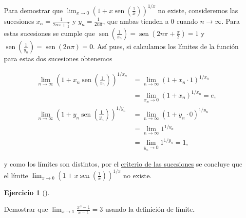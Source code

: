 \documentclass[
  spanish,
  a4paper,
]{scrreport}
\theoremstyle{definition}
\newtheorem{exercise}{Ejercicio}[chapter]
\theoremstyle{remark}
\begin{document}
\begin{tcolorbox}
Para demostrar que
\(\lim_{x\to 0}\left(1+x\operatorname{sen}\left(\frac{1}{x}\right)\right)^{1/x}\)
no existe, consideremos las sucesiones
\(x_n = \frac{1}{2n\pi+\frac{\pi}{2}}\) y \(y_n = \frac{1}{2n\pi}\), que
ambas tienden a 0 cuando \(n \to \infty\). Para estas sucesiones se
cumple que
\(\operatorname{sen}\left(\frac{1}{x_n}\right) = \operatorname{sen}(2n\pi+\frac{\pi}{2}) = 1\)
y
\(\operatorname{sen}\left(\frac{1}{y_n}\right) = \operatorname{sen}(2n\pi) = 0\).
Así pues, si calculamos los límites de la función para estas dos
sucesiones obtenemos

\begin{align*}
\lim_{n \to \infty} \left(1+x_n \operatorname{sen}\left(\frac{1}{x_n}\right)\right)^{1/x_n} 
&= \lim_{n \to \infty} (1+x_n\cdot 1)^{1/x_n} \\
&= \lim_{x_n\to 0} (1+x_n)^{1/x_n} = e,\\
\lim_{n \to \infty} \left(1+y_n \operatorname{sen}\left(\frac{1}{y_n}\right)\right)^{1/y_n} 
&= \lim_{n \to \infty} \left(1+y_n\cdot 0\right)^{1/y_n} \\
&= \lim_{n \to \infty} 1^{1/y_n} \\
&= \lim_{y_n\to 0} 1^{1/y_n} = 1,
\end{align*}

y como los límites son distintos, por el
\href{https://aprendeconalf.es/analisis-manual/06-limites.html\#thm-criterio-sucesiones}{criterio
de las sucesiones} se concluye que el límite
\(\lim_{x\to 0}\left(1+x\operatorname{sen}\left(\frac{1}{x}\right)\right)^{1/x}\)
no existe.

\end{tcolorbox}

\begin{exercise}[]\protect\hypertarget{exr-4}{}\label{exr-4}

Demostrar que \(\lim_{x\to 1} \frac{x^3-1}{x-1} = 3\) usando la
definición de límite.

\end{exercise}
\end{document}
